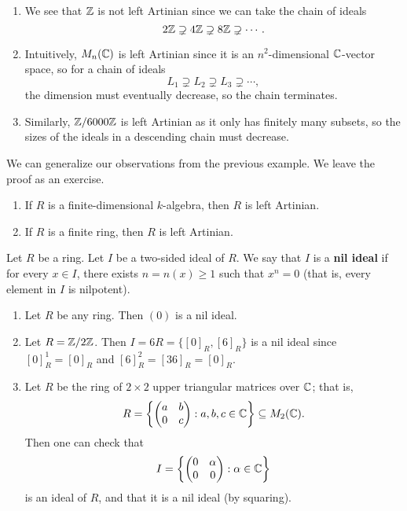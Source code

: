 \begin{exmp}{}
\begin{enumerate}[(1)]
    \item We see that $\mathbb{Z}$ is not left Artinian since we can take the chain of ideals 
    \[ 2\mathbb{Z} \supsetneq 4\mathbb{Z} \supsetneq 8\mathbb{Z} \supsetneq \cdots. \]
    \item Intuitively, $M_n(\mathbb{C})$ is left Artinian since it is an $n^2$-dimensional $\mathbb{C}$-vector space, so
    for a chain of ideals
    \[ L_1 \supsetneq L_2 \supsetneq L_3 \supsetneq \cdots, \]
    the dimension must eventually decrease, so the chain terminates.
    \item Similarly, $\mathbb{Z}/6000\mathbb{Z}$ is left Artinian as it only has finitely many subsets, so the 
    sizes of the ideals in a descending chain must decrease. 
\end{enumerate}
\end{exmp}

We can generalize our observations from the previous example. We leave the proof as an exercise.

\begin{remark}{}
\begin{enumerate}[(1)]
    \item If $R$ is a finite-dimensional $k$-algebra, then $R$ is left Artinian.
    \item If $R$ is a finite ring, then $R$ is left Artinian.
\end{enumerate}
\end{remark}

\begin{defn}{}
Let $R$ be a ring. Let $I$ be a two-sided ideal of $R$. We say that $I$ is a {\bf nil ideal} 
if for every $x \in I$,  there exists $n = n(x) \geq 1$ such that $x^n = 0$ (that is, 
every element in $I$ is nilpotent). 
\end{defn}

\begin{exmp}{}
\begin{enumerate}[(1)]
    \item Let $R$ be any ring. Then $(0)$ is a nil ideal. 
    \item Let $R = \mathbb{Z}/2\mathbb{Z}$. Then $I = 6R = \{[0]_R, [6]_R\}$ is a nil ideal since 
    $[0]_R^1 = [0]_R$ and $[6]_R^2 = [36]_R = [0]_R$. 
    \item Let $R$ be the ring of $2 \times 2$ upper triangular matrices over $\mathbb{C}$; that is, 
    \[ R = \left\{ \begin{pmatrix} a&b\\0&c \end{pmatrix} : a, b,c \in \mathbb{C} \right\} \subseteq M_2(\mathbb{C}). \]
    Then one can check that 
    \[ I = \left\{ \begin{pmatrix} 0&\alpha\\0&0 \end{pmatrix} : \alpha \in \mathbb{C} \right\} \]
    is an ideal of $R$, and that it is a nil ideal (by squaring). 
\end{enumerate}
\end{exmp}

